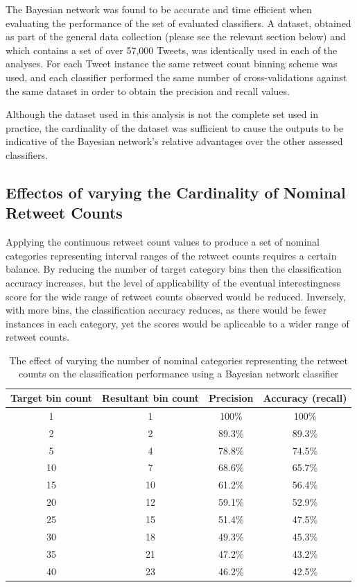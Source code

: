 The Bayesian network was found to be accurate and time efficient when evaluating the performance of the set of evaluated classifiers. A dataset, obtained as part of the general data collection (please see the relevant section below) and which contains a set of over 57,000 Tweets, was identically used in each of the analyses. For each Tweet instance the same retweet count binning scheme was used, and each classifier performed the same number of cross-validations against the same dataset in order to obtain the precision and recall values.

Although the dataset used in this analysis is not the complete set used in practice, the cardinality of the dataset was sufficient to cause the outputs to be indicative of the Bayesian network's relative advantages over the other assessed classifiers.


\subsection{Effectos of varying the Cardinality of Nominal Retweet Counts}
Applying the continuous retweet count values to produce a set of nominal categories representing interval ranges of the retweet counts requires a certain balance. By reducing the number of target category bins then the classification accuracy increases, but the level of applicability of the eventual interestingness score for the wide range of retweet counts observed would be reduced. Inversely, with more bins, the classification accuracy reduces, as there would be fewer instances in each category, yet the scores would be apliccable to a wider range of retweet counts.

\begin{table}[h]\footnotesize
\begin{center}
\begin{tabular}{ c | c | c | c }
	Target bin count	& Resultant bin count & Precision &  Accuracy (recall) \\
	\hline
	\hline 
    1 & 1 & 100\% & 100\% \\
    2 & 2 & 89.3\% & 89.3\% \\
    5 & 4 & 78.8\%  & 74.5\% \\
    10 & 7 & 68.6\% & 65.7\% \\
    15 & 10 & 61.2\% & 56.4\% \\
    20 & 12 & 59.1\% & 52.9\% \\
    25 & 15 & 51.4\% & 47.5\% \\
    30 & 18 & 49.3\% & 45.3\% \\
    35 & 21 & 47.2\% & 43.2\% \\
    40 & 23 & 46.2\% & 42.5\% \\
    \hline  
\end{tabular}
\end{center}
\caption{The effect of varying the number of nominal categories representing the retweet counts on the classification performance using a Bayesian network classifier}
\label{table:binperformance}
\end{table}

